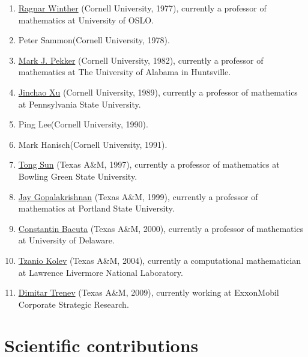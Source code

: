 \documentclass[CJK,11pt]{amsart}
\theoremstyle{definition}
\begin{document}
\begin{CJK*}{UTF8}{gbsn}
\begin{enumerate}
\item
  \href{https://www.mn.uio.no/math/english/people/aca/rwinther/}{Ragnar
    Winther} (Cornell University, 1977), currently a professor of mathematics at University of OSLO.
\item Peter Sammon(Cornell University, 1978).
\item
  \href{https://www.uah.edu/science/departments/math/faculty-staff/mark-pekker}{Mark
    J. Pekker} (Cornell University, 1982), currently a professor of mathematics at The University of Alabama in Huntsville.
\item \href{https://www.personal.psu.edu/jxx1/}{Jinchao Xu} (Cornell University, 1989), currently a professor of mathematics at Pennsylvania State University. 
\item Ping Lee(Cornell University, 1990).
\item Mark Hanisch(Cornell University, 1991).
\item
  \href{https://www.bgsu.edu/arts-and-sciences/mathematics-and-statistics/faculty-and-staff/tong-sun.html}{Tong
    Sun} (Texas A\&M, 1997), currently a professor of mathematics at Bowling Green State University.
\item \href{http://web.pdx.edu/~gjay/}{Jay Gopalakrishnan} (Texas A\&M, 1999), currently a professor of mathematics at Portland State University.
\item \href{http://www.math.udel.edu/~bacuta/}{Constantin Bacuta} (Texas A\&M, 2000), currently a professor of mathematics at University of Delaware.
\item \href{https://people.llnl.gov/kolev1}{Tzanio Kolev} (Texas A\&M, 2004), currently a computational mathematician at Lawrence Livermore National Laboratory.
\item \href{https://scholar.google.com/citations?user=EeWTb_wAAAAJ&hl=en}{Dimitar Trenev} (Texas A\&M, 2009), currently working at ExxonMobil Corporate Strategic Research.
\end{enumerate}


\section{Scientific contributions}



\end{CJK*}
\end{document}
